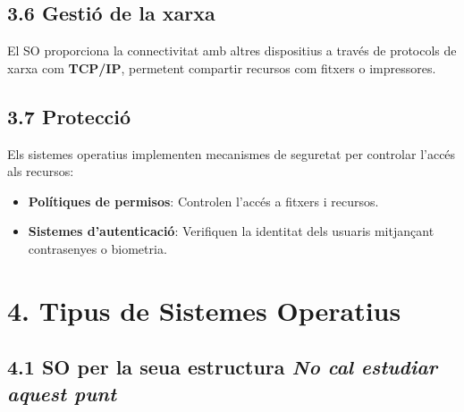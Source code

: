 \documentclass[
  a4paper,
]{article}
\begin{document}
\subsection{3.6 Gestió de la xarxa}\label{gestiuxf3-de-la-xarxa}

El SO proporciona la connectivitat amb altres dispositius a través de
protocols de xarxa com \textbf{TCP/IP}, permetent compartir recursos com
fitxers o impressores.

\subsection{3.7 Protecció}\label{protecciuxf3}

Els sistemes operatius implementen mecanismes de seguretat per controlar
l'accés als recursos:

\begin{itemize}
\item
  \textbf{Polítiques de permisos}: Controlen l'accés a fitxers i
  recursos.
\item
  \textbf{Sistemes d'autenticació}: Verifiquen la identitat dels usuaris
  mitjançant contrasenyes o biometria.
\end{itemize}

\section{4. Tipus de Sistemes
Operatius}\label{tipus-de-sistemes-operatius}

\subsection{\texorpdfstring{4.1 SO per la seua estructura \emph{No cal
estudiar aquest
punt}}{4.1 SO per la seua estructura No cal estudiar aquest punt}}\label{so-per-la-seua-estructura-no-cal-estudiar-aquest-punt}
\end{document}
